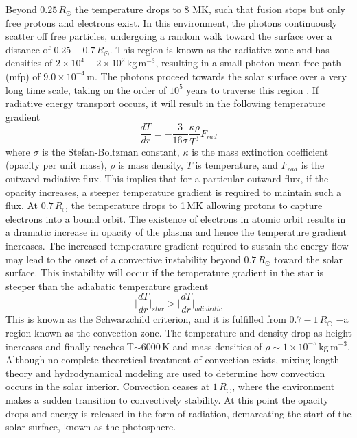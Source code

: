 Beyond $0.25\,R_{\odot}$ the temperature drops to 8 MK, such that fusion stops but only free protons and electrons exist. In this environment, the photons continuously scatter off free particles, undergoing a random walk toward the surface over a distance of $0.25-0.7\,R_{\odot}$. This region is known as the radiative zone and has densities of $2\times10^4-2\times10^2$\,kg\,m$^{-3}$, resulting in a small photon mean free path (mfp) of $9.0\times10^{-4}$\,m. The photons proceed towards the solar surface over a very long time scale, taking on the order of $10^{5}$ years to traverse this region \citep{mitalas1992}. If radiative energy transport occurs, it will result in the following temperature gradient
\begin{equation}
\frac{dT}{dr} = -\frac{3}{16 \sigma}\frac{\kappa \rho}{T^3}F_{rad}
\end{equation}
where $\sigma$ is the Stefan-Boltzman constant, $\kappa$ is the mass extinction coefficient (opacity per unit mass), $\rho$ is mass density, $T$ is temperature, and $F_{rad}$ is the outward radiative flux. This implies that for a particular outward flux, if the opacity increases, a steeper temperature gradient is required to maintain such a flux. At $0.7\,R_{\odot}$ the temperature drops to 1\,MK allowing protons to capture electrons into a bound orbit. The existence of electrons in atomic orbit results in a dramatic increase in opacity of the plasma \citep{turk2011} and hence the temperature gradient increases. The increased temperature gradient required to sustain the energy flow may lead to the onset of a convective instability beyond $0.7\,R_{\odot}$ toward the solar surface. This instability will occur if the temperature gradient in the star is steeper than the adiabatic temperature gradient
\begin{equation}
\Bigg|\frac{dT}{dr}\Bigg|_{star} > \Bigg|\frac{dT}{dr}\Bigg|_{adiabatic}
\end{equation}
This is known as the Schwarzchild criterion, and it is fulfilled from $0.7-1\,R_{\odot}$ $-$a region known as the convection zone. The temperature and density drop as height increases and finally reaches T$\sim$$6000$\,K and mass densities of $\rho\sim1\times10^{-5}$\,kg\,m$^{-3}$. Although no complete theoretical treatment of convection exists, mixing length theory and hydrodynamical modeling are used to determine how convection occurs in the solar interior. Convection ceases at $1\,R_{\odot}$, where the environment makes a sudden transition to convectively stability. At this point the opacity drops and energy is released in the form of radiation, demarcating the start of the solar surface, known as the photosphere. 

